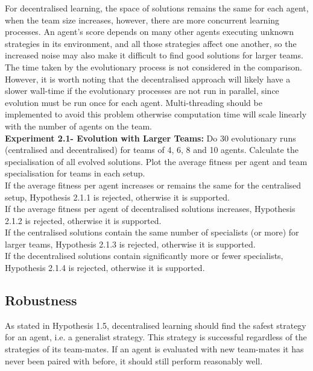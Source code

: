 \documentclass[12pt]{article}
\begin{document}
For decentralised learning, the space of solutions remains the same for each agent, when the team size increases, however, there are more concurrent learning processes. 
An agent’s score depends on many other agents executing unknown strategies in its environment, and all those strategies affect one another, so the increased noise may also make it difficult to find good solutions for larger teams.
The time taken by the evolutionary process is not considered in the comparison.
However, it is worth noting that the decentralised approach will likely have a slower wall-time if the evolutionary processes are not run in parallel, since evolution must be run once for each agent.
Multi-threading should be implemented to avoid this problem otherwise computation time will scale linearly with the number of agents on the team.\\

\textbf{Experiment 2.1- Evolution with Larger Teams:} Do 30 evolutionary runs (centralised and decentralised) for teams of 4, 6, 8 and 10 agents.
Calculate the specialisation of all evolved solutions.
Plot the average fitness per agent and team specialisation for teams in each setup. \\

If the average fitness per agent increases or remains the same for the centralised setup, Hypothesis 2.1.1 is rejected, otherwise it is supported.\\

If the average fitness per agent of decentralised solutions increases, Hypothesis 2.1.2 is rejected, otherwise it is supported.\\

If the centralised solutions contain the same number of specialists (or more) for larger teams, Hypothesis 2.1.3 is rejected, otherwise it is supported.\\

If the decentralised solutions contain significantly more or fewer specialists, Hypothesis 2.1.4 is rejected, otherwise it is supported.\\

\subsection{Robustness}

As stated in Hypothesis 1.5, decentralised learning should find the safest strategy for an agent, i.e. a generalist strategy. This strategy is successful regardless of the strategies of its team-mates. If an agent is evaluated with new team-mates it has never been paired with before, it should still perform reasonably well. \\
\end{document}
